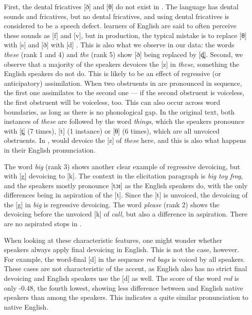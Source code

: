 \documentclass[output=paper]{LSP/langsci}
\begin{document}
First, the dental fricatives [ð] and [θ] do not exist in . The language has dental sounds and fricatives, but no dental fricatives, and using dental fricatives is considered to be a speech defect.  learners of English are said to often perceive these sounds as [f] and [v], but in production, the typical mistake is to replace [θ] with [s] and [ð] with [d] \citep[p. 71]{nadasdy_background_2006}. This is also what we observe in our data: the words \textit{these} (rank 1 and 4) and \textit{the} (rank 5) show [ð] being replaced by [d̪]. Second, we observe that a majority of the  speakers devoices the [z] in \textit{these}, something the English speakers do not do. This is likely to be an effect of  regressive (or anticipatory) assimilation. When two obstruents in  are pronounced in sequence, the first one assimilates to the second one --- if the second obstruent is voiceless, the first obstruent will be voiceless, too. This can also occur across word boundaries, as long as there is no phonological gap. In the original text, both instances of \textit{these} are followed by the word \textit{things}, which the speakers pronounce with [t̪] (7 times), [t] (1 instance) or [θ] (6 times), which are all unvoiced obstruents. In ,  would devoice the [z] of \textit{these} here, and this is also what happens in their English pronunciation.

The word \textit{big} (rank 3) shows another clear example of regressive devoicing, but with [g] devoicing to [k]. The context in the elicitation paragraph is \textit{big toy frog}, and the  speakers mostly pronounce [tɔɪ] as the English speakers do, with the only differences being in aspiration of the [t]. Since the [t] is unvoiced, the devoicing of the [g] in \textit{big} is regressive devoicing. The word \textit{please} (rank 2) shows the devoicing before the unvoiced [k] of \textit{call}, but also a difference in aspiration. There are no aspirated stops in  \citep{petrova_voice_2006}.

When looking at these characteristic features, one might wonder whether speakers always apply final devoicing in English. This is not the case, however. For example, the word-final [d] in the sequence \textit{red bags} is voiced by all  speakers. These cases are not characteristic of the  accent, as English also has no strict final devoicing and English speakers use the [d] as well. The score of the word \textit{red} is only -0.48, the fourth lowest, showing less difference between  and English native speakers than among the  speakers. This indicates a quite similar pronunciation to native English.
\end{document}

